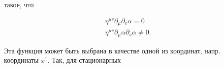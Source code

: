 \documentclass[10pt]{article}
\begin{document}
такое, что



\[

\begin{gathered}

\eta^{\mu v} \partial_{\mu} \partial_{v} \alpha=0 \\

\eta^{\mu v} \partial_{\mu} \alpha \partial_{v} \alpha \neq 0 .

\end{gathered}

\]



Эта функция может быть выбрана в качестве одной из координат, напр. координаты $x^{1}$. Так, для стационарных
\end{document}
